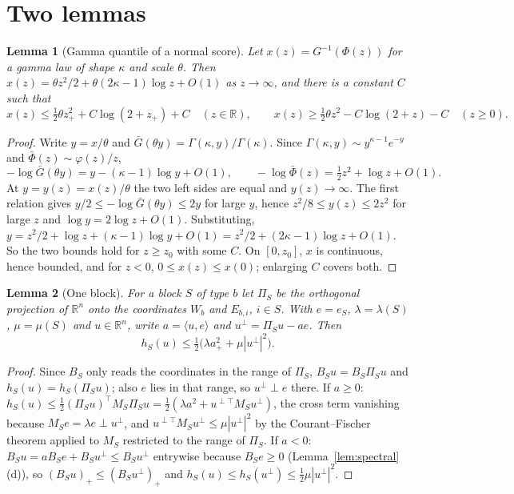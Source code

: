 \documentclass[11pt]{article}
\newtheorem{lemma}{Lemma}
\theoremstyle{definition}
\theoremstyle{remark}
\newcommand{\R}{\mathbb{R}}
\newcommand{\ip}[2]{\langle #1,#2\rangle}
\begin{document}
\section{Two lemmas}
\label{sec:lemmas}

\begin{lemma}[Gamma quantile of a normal score]\label{lem:quantile}
Let $x(z)=G^{-1}(\Phi(z))$ for a gamma law of shape $\kappa$ and scale $\theta$. Then
$x(z)=\theta z^2/2+\theta(2\kappa-1)\log z+O(1)$ as $z\to\infty$, and there is a constant
$C$ such that
\[
x(z)\le\tfrac12\theta z_+^2+C\log(2+z_+)+C\quad(z\in\R),\qquad
x(z)\ge\tfrac12\theta z^2-C\log(2+z)-C\quad(z\ge0).
\]
\end{lemma}

\begin{proof}
Write $y=x/\theta$ and $\bar G(\theta y)=\Gamma(\kappa,y)/\Gamma(\kappa)$. Since
$\Gamma(\kappa,y)\sim y^{\kappa-1}e^{-y}$ \citep[\S8.11]{DLMF2010} and
$\bar\Phi(z)\sim\varphi(z)/z$,
\[
-\log\bar G(\theta y)=y-(\kappa-1)\log y+O(1),\qquad
-\log\bar\Phi(z)=\tfrac12z^2+\log z+O(1).
\]
At $y=y(z)=x(z)/\theta$ the two left sides are equal and $y(z)\to\infty$. The first relation
gives $y/2\le-\log\bar G(\theta y)\le2y$ for large $y$, hence $z^2/8\le y(z)\le2z^2$ for
large $z$ and $\log y=2\log z+O(1)$. Substituting,
$y=z^2/2+\log z+(\kappa-1)\log y+O(1)=z^2/2+(2\kappa-1)\log z+O(1)$. So the two bounds
hold for $z\ge z_0$ with some $C$. On $[0,z_0]$, $x$ is continuous, hence bounded, and
for $z<0$, $0\le x(z)\le x(0)$; enlarging $C$ covers both.
\end{proof}

\begin{lemma}[One block]\label{lem:block}
For a block $S$ of type $b$ let $\Pi_S$ be the orthogonal projection of $\R^n$ onto the
coordinates $W_b$ and $E_{b,i}$, $i\in S$. With $e=e_S$, $\lambda=\lambda(S)$, $\mu=\mu(S)$
and $u\in\R^n$, write $a=\ip ue$ and $u^\perp=\Pi_Su-ae$. Then
\[
h_S(u)\le\tfrac12\big(\lambda a_+^2+\mu|u^\perp|^2\big).
\]
\end{lemma}

\begin{proof}
Since $B_S$ only reads the coordinates in the range of $\Pi_S$, $B_Su=B_S\Pi_Su$ and
$h_S(u)=h_S(\Pi_Su)$; also $e$ lies in that range, so $u^\perp\perp e$ there. If $a\ge0$:
$h_S(u)\le\frac12(\Pi_Su)^\top M_S\Pi_Su=\frac12(\lambda a^2+u^{\perp\top}M_Su^\perp)$, the
cross term vanishing because $M_Se=\lambda e\perp u^\perp$, and
$u^{\perp\top}M_Su^\perp\le\mu|u^\perp|^2$ by the Courant--Fischer theorem applied to $M_S$
restricted to the range of $\Pi_S$. If $a<0$: $B_Su=aB_Se+B_Su^\perp\le B_Su^\perp$
entrywise because $B_Se\ge0$ (Lemma~\ref{lem:spectral}(d)), so
$(B_Su)_+\le(B_Su^\perp)_+$ and $h_S(u)\le h_S(u^\perp)\le\frac12\mu|u^\perp|^2$.
\end{proof}
\end{document}

